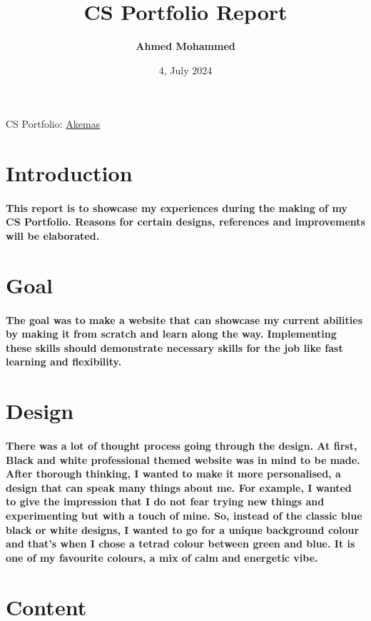\documentclass[12pt, book]{article}
\title{CS Portfolio Report}
\author{\textbf{Ahmed Mohammed}}
\date{4, July 2024}
\begin{document}
\maketitle
\centerline{CS Portfolio: \href{https://akemas.github.io/}{Akemas}}
\newpage

\section{Introduction}
\paragraph{This report is to showcase my experiences during the making of my CS Portfolio. Reasons for certain designs, references and improvements will be elaborated.}

\section{Goal}
\paragraph{The goal was to make a website that can showcase my current abilities by making it from scratch and learn along the way. Implementing these skills should demonstrate necessary skills for the job like fast learning and flexibility. }

\section{Design}
\paragraph{There was a lot of thought process going through the design. At first, Black and white professional themed website was in mind to be made. After thorough thinking, I wanted to make it more personalised, a design that can speak many things about me. For example, I wanted to give the impression that I do not fear trying new things and experimenting but with a touch of mine. So, instead of the classic blue black or white designs, I wanted to go for a unique background colour and that's when I chose a tetrad colour between green and blue. It is one of my favourite colours, a mix of calm and energetic vibe.}

\section{Content}
\end{document}

